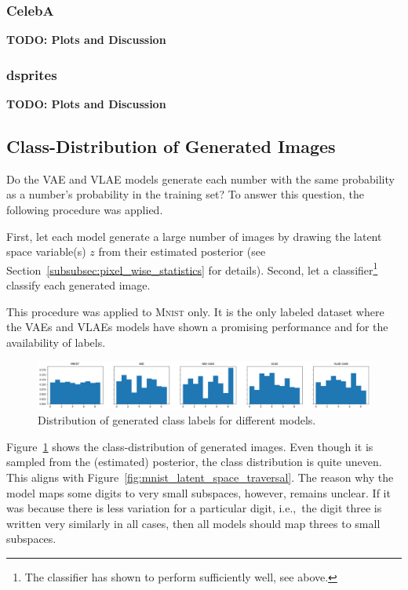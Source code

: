 \subsubsection{CelebA}
\textbf{TODO: Plots and Discussion}

\subsubsection{dsprites}
\textbf{TODO: Plots and Discussion}

\subsection{Class-Distribution of Generated Images}\label{subsec:class-distribution-of-generated-images}

Do the \ac{VAE} and \ac{VLAE} models generate each number with the same probability as a number's probability in the training set?
To answer this question, the following procedure was applied.

First, let each model generate a large number of images by drawing the latent space variable(s) $z$ from their estimated posterior (see Section~\ref{subsubsec:pixel_wise_statistics} for details).
Second, let a classifier\footnote{The classifier has shown to perform sufficiently well, see above.} classify each generated image.

This procedure was applied to \textsc{Mnist} only.
It is the only labeled dataset where the \acp{VAE} and \acp{VLAE} models have shown a promising performance and for the availability of labels.

\begin{figure}
    \centering
    \includegraphics[width=\textwidth]{images/generated_vs_true/class_distr.png}
    \caption{Distribution of generated class labels for different models.}
    \label{fig:generated_class_distribution}
\end{figure}

Figure~\ref{fig:generated_class_distribution} shows the class-distribution of generated images.
Even though it is sampled from the (estimated) posterior, the class distribution is quite uneven.
This aligns with Figure~\ref{fig:mnist_latent_space_traversal}.
The reason why the model maps some digits to very small subspaces, however, remains unclear.
If it was because there is less variation for a particular digit, i.e.,~the digit three is written very similarly in all cases, then all models should map threes to small subspaces.

